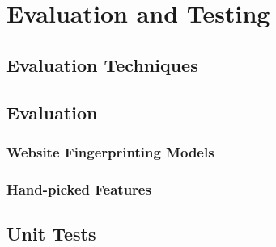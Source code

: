 \section{Evaluation and Testing}

\subsection{Evaluation Techniques}

\subsection{Evaluation}


\subsubsection{Website Fingerprinting Models}



\subsubsection{Hand-picked Features}



\subsection{Unit Tests}
